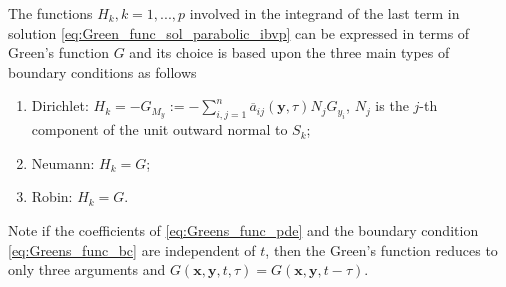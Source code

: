 \documentclass[\main/thesis.tex]{subfiles}
\begin{document}
The functions $H_k, k{=}1, ..., p$ involved in the integrand of the last term in solution \eqref{eq:Green_func_sol_parabolic_ibvp} can be expressed in terms of Green's function $G$ and its choice is based upon the three main types of boundary conditions as follows
\begin{enumerate}
\item Dirichlet: $H_k {=} {-}G_{M_y} {:=} {-}\sum_{i, j {=} 1}^{n} \overline{a}_{ij}(\boldsymbol{y}, \tau) N_j G_{y_i}$, 
                 $N_j$ is the $j$-th \\ \hspace*{1.75cm} component of the unit outward normal to $S_k$;
\item Neumann: $H_k {=} G$;
\item Robin: $H_k {=} G$.
\end{enumerate}
Note if the coefficients of \eqref{eq:Greens_func_pde} and the boundary condition \eqref{eq:Greens_func_bc} are independent of $t$, then  
the Green's function reduces to only three arguments and $G(\boldsymbol{x}, \boldsymbol{y}, t, \tau) {=} G(\boldsymbol{x}, \boldsymbol{y}, t{-}\tau)$.
\end{document}
